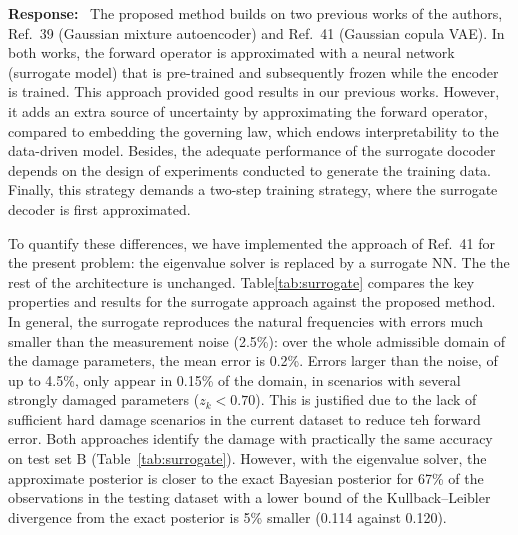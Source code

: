 \documentclass[11pt]{article}
\newenvironment{response}{\par\smallskip\noindent\color{resp}\textbf{Response:}\ }{\par}
\begin{document}
\begin{response}
	The proposed method builds on two previous works of the authors, Ref.~39 (Gaussian mixture autoencoder) and Ref.~41 (Gaussian copula VAE).
	In both works, the forward operator is approximated with a neural network (surrogate model) that is pre-trained and subsequently frozen while the encoder is trained.
	This approach provided good results in our previous works.
	However, it adds an extra source of uncertainty by approximating the forward operator, compared to embedding the governing law, which endows interpretability to the data-driven model. 
	Besides, the adequate performance of the surrogate docoder depends on the design of experiments conducted to generate the training data.
	Finally, this strategy demands a two-step training strategy, where the surrogate decoder is first approximated. 
	
	To quantify these differences, we have implemented the approach of Ref.~41 for the present problem: the eigenvalue solver is replaced by a surrogate NN. The the rest of the architecture is unchanged.
	Table\ref{tab:surrogate} compares the key properties and results for the surrogate approach against the proposed method. 
	In general, the surrogate reproduces the natural frequencies with errors much smaller than the measurement noise (2.5\%): over the whole admissible domain of the damage parameters, the mean error is 0.2\%.
	Errors larger than the noise, of up to 4.5\%, only appear in 0.15\% of the domain, in scenarios with several strongly damaged parameters ($z_k<0.70$).
	This is justified due to the lack of sufficient hard damage scenarios in the current dataset to reduce teh forward error. 
	Both approaches identify the damage with practically the same accuracy on test set B (Table~\ref{tab:surrogate}).
	However, with the eigenvalue solver, the approximate posterior is closer to the exact Bayesian posterior for 67\% of the observations in the testing dataset with a lower bound of the Kullback--Leibler divergence from the exact posterior is 5\% smaller (0.114 against 0.120).
	

\end{response}
\end{document}
